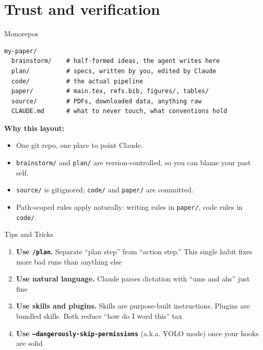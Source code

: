 \documentclass[9pt,aspectratio=169]{beamer}
\begin{document}
\section{Trust and verification}

\begin{frame}[fragile]{Monorepos}
  \vspace{0.4cm}
  \begin{lstlisting}[style=shell]
my-paper/
  brainstorm/    # half-formed ideas, the agent writes here
  plan/          # specs, written by you, edited by Claude
  code/          # the actual pipeline
  paper/         # main.tex, refs.bib, figures/, tables/
  source/        # PDFs, downloaded data, anything raw
  CLAUDE.md      # what to never touch, what conventions hold
  \end{lstlisting}
  \vspace{0.3cm}
  \textbf{Why this layout:}
  \begin{itemize}
    \setlength\itemsep{0.3em}
    \item One git repo, one place to point Claude.
    \item \texttt{brainstorm/} and \texttt{plan/} are version-controlled, so you can blame your past self.
    \item \texttt{source/} is gitignored; \texttt{code/} and \texttt{paper/} are committed.
    \item Path-scoped rules apply naturally: writing rules in \texttt{paper/}, code rules in \texttt{code/}.
  \end{itemize}
\end{frame}


\begin{frame}{Tips and Tricks}

  \begin{enumerate}
    \setlength\itemsep{0.4em}
    \item \textbf{Use \texttt{/plan}.} Separate ``plan step'' from ``action step.'' This single habit fixes more bad runs than anything else
    \item \textbf{Use natural language.} Claude parses dictation with ``ums and ahs'' just fine
    \item \textbf{Use skills and plugins.} Skills are purpose-built instructions. Plugins are bundled skills. Both reduce ``how do I word this'' tax
    \item \textbf{Use \texttt{--dangerously-skip-permissions}} (a.k.a. YOLO mode) once your hooks are solid
  \end{enumerate}

\end{frame}
\end{document}
